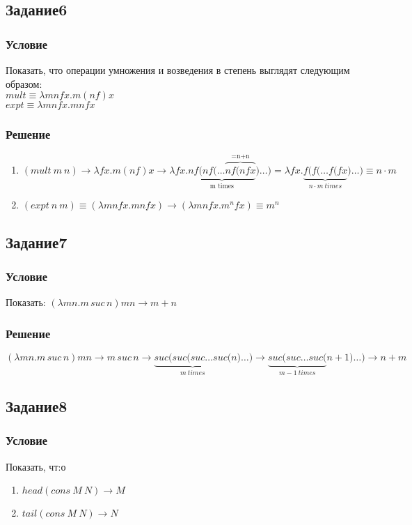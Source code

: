 \documentclass[10pt,a4paper]{article}
\begin{document}
\subsection*{Задание6}
\subsubsection*{Условие}
Показать, что операции умножения и возведения в степень выглядят
следующим образом:\\
$mult \equiv \lambda mnfx.m(nf)x$\\
$expt \equiv \lambda mnfx.mnfx$
\subsubsection*{Решение}
\begin{enumerate}
\item 
$(mult\ m\ n) \longrightarrow \lambda fx.m(nf)x \longrightarrow 
\lambda fx.\underbrace{nf(nf(\ldots \overbrace
{nf(nfx}^\text{=n+n}}_\text{m times})\ldots) = \lambda
fx.\underbrace{f(f(\ldots f(fx}_{n \cdot m\ times})\ldots) \equiv
n\cdot m$ 

\item
$
(expt\ n\ m) \equiv (\lambda mnfx.mnfx) \rightarrow 
(\lambda mnfx.m^nfx) \equiv m^n
$

\end{enumerate}

\subsection*{Задание7}
\subsubsection*{Условие}
Показать: $(\lambda mn.m\,suc\,n)mn \longrightarrow m+n $
\subsubsection*{Решение}
 $(\lambda mn.m\,suc\,n)mn \longrightarrow m\,suc\,n
\longrightarrow \underbrace{ suc(suc(suc \ldots suc(}_{m\ times}n)
\ldots ) \longrightarrow \underbrace{ suc(suc \ldots suc(}_{m-1\
  times}{n\!+\!1}) \ldots ) \longrightarrow n + m $
\subsection*{Задание8}
\subsubsection*{Условие}
Показать, чт:о
\begin{enumerate}
\item $head(cons\ M\ N) \longrightarrow M$ 
\item $tail(cons\ M\ N) \longrightarrow N$ 
\end{enumerate}
\end{document}
